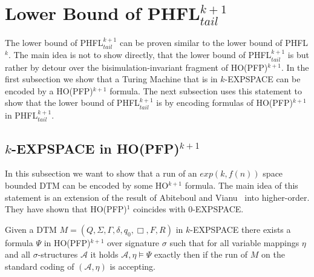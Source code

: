 
\section{Lower Bound of PHFL$^{k + 1}_{tail}$}\label{sec:lowerBoundOfPhflTail}

The lower bound of PHFL$^{k+1}_{tail}$ can be proven similar to the lower bound of PHFL$^k$. The main idea is not to
show directly, that the lower bound of PHFL$^{k+1}_{tail}$ is  but rather by detour over the
bisimulation-invariant fragment of HO(PFP)$^{k+1}$. In the first subsection we show that a Turing Machine that is in
$k$-EXPSPACE can be encoded by a HO(PFP)$^{k+1}$ formula. The next subsection uses this statement to show that the
lower bound of PHFL$^{k+1}_{tail}$ is  by encoding formulas of HO(PFP)$^{k+1}$ in PHFL$^{k+1}_{tail}$.

\subsection{$k$-EXPSPACE in HO(PFP)$^{k+1}$}\label{subsec:kExpspaceInHopfp}

In this subsection we want to show that a run of an $exp(k, f(n))$ space bounded DTM can be encoded by some
HO$^{k+1}$ formula. The main idea of this statement is an extension of the result of Abiteboul and
Vianu~\cite{abiteboul1995computing} into higher-order. They have shown that HO(PFP)$^1$ coincides with $0$-EXPSPACE.


\begin{lemma}
    \label{lemma:expspace_in_ho_pfp}
    Given a DTM $M = (Q, \Sigma, \Gamma, \delta, q_0, \Box, F, R)$ in $k$-EXPSPACE there exists a formula $\Psi$ in HO(PFP)$^{k+1}$ over signature $\sigma$ such that for all variable mappings $\eta$ and all $\sigma$-structures $\mathcal{A}$ it holds $\mathcal{A}, \eta \models \Psi$ exactly then if the run of $M$ on the standard coding of $(\mathcal{A}, \eta)$ is accepting.
\end{lemma}

